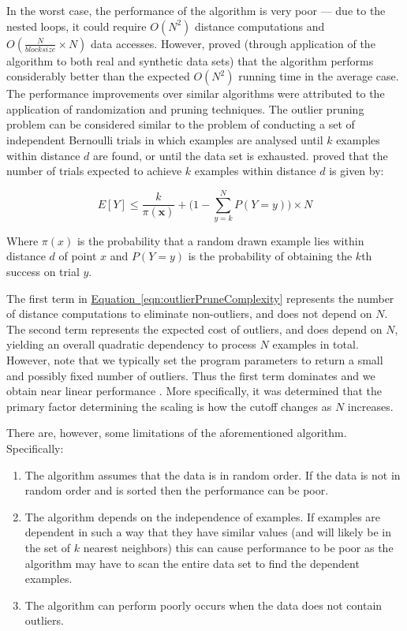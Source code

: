 In the worst case, the performance of the algorithm is very poor --- due to the 
nested loops, it could require $O(N^{2})$ distance computations and 
$O(\frac{N}{blocksize} \times N)$ data accesses. However, \citeauthor{Bay:2003} 
proved (through application of the algorithm to both real and synthetic data
sets) that the algorithm performs considerably better than the expected 
$O(N^{2})$ running time in the average case. The performance improvements over 
similar algorithms were attributed to the application of randomization and 
pruning techniques. The outlier pruning problem can be considered similar to the
problem of conducting a set of independent Bernoulli trials in which examples 
are analysed until $k$ examples within distance $d$ are found, or until the data
set is exhausted. \citeauthor{Bay:2003} proved that the number of trials 
expected to achieve $k$ examples within distance $d$ is given by:

\begin{equation}
\label{eqn:outlierPruneComplexity}
E[Y] \leq \frac{k}{\pi(\textbf{x})} + \Bigg(1 - \sum_{y=k}^{N} P(Y=y)\Bigg) \times N
\end{equation}

Where $\pi(x)$ is the probability that a random drawn example lies within 
distance $d$ of point $x$ and $P(Y=y)$ is the probability of obtaining the $k$th 
success on trial $y$.

The first term in \hyperref[eqn:outlierPruneComplexity]
{Equation~\ref{eqn:outlierPruneComplexity}} represents the number of distance 
computations to eliminate non-outliers, and does not depend on $N$. The second 
term represents the expected cost of outliers, and does depend on $N$, yielding 
an overall quadratic dependency to process $N$ examples in total. However, note 
that we typically set the program parameters to return a small and possibly 
fixed number of outliers. Thus the first term dominates and we obtain near 
linear performance \cite{Bay:2003}. More specifically, it was determined that 
the primary factor determining the scaling is how the cutoff changes as $N$ 
increases.

There are, however, some limitations of the aforementioned algorithm. 
Specifically:
\begin{enumerate}
\item The algorithm assumes that the data is in random order. If the data is not
in random order and is sorted then the performance can be poor.
\item The algorithm depends on the independence of examples. If examples are 
dependent in such a way that they have similar values (and will likely be in the
set of $k$ nearest neighbors) this can cause performance to be poor as the
algorithm may have to scan the entire data set to find the dependent examples.
\item The algorithm can perform poorly occurs when the data does not contain 
outliers.
\end{enumerate}
